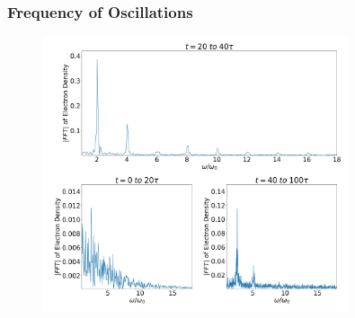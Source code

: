\documentclass{beamer}
\begin{document}
\begin{frame}
    \frametitle{Frequency of Oscillations}
    \begin{figure}
        \centering
        \includegraphics[width=0.8\textwidth, height=0.8\textheight]{images/oscillation2.jpg}
        \label{fig:Oscillations2}
    \end{figure}
\end{frame}
\end{document}
